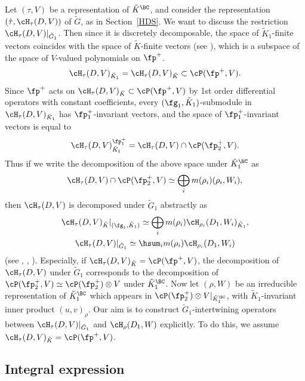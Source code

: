 Let $(\tau,V)$ be a representation of $\tilde{K}^\BC$, and consider the representation $(\hat{\tau},\cH_\tau(D,V))$ of $\tilde{G}$, as in Section~\ref{HDS}.
We want to discuss the restriction $\cH_\tau(D,V)|_{\tilde{G}_1}$.
Then since it is discretely decomposable, the space of $\tilde{K}_1$-finite vectors coincides with the space of $\tilde{K}$-finite vectors
(see \cite[Theorem~4.5]{K1}),
which is a subspace of the space of $V$-valued polynomials on $\fp^+$.
\begin{gather*} \cH_\tau(D,V)_{\tilde{K}_1}=\cH_\tau(D,V)_{\tilde{K}}\subset\cP(\fp^+,V). \end{gather*}
Since $\fp^+$ acts on $\cH_\tau(D,V)_{\tilde{K}}\subset\cP(\fp^+,V)$ by 1st order differential operators with constant coefficients,
every $(\fg_1,\tilde{K}_1)$-submodule in $\cH_\tau(D,V)_{\tilde{K}_1}$ has $\fp^+_1$-invariant vectors,
and the space of $\fp^+_1$-invariant vectors is equal to
\begin{gather*} \cH_\tau(D,V)_{\tilde{K}_1}^{\fp^+_1}=\cH_\tau(D,V)\cap\cP(\fp^+_2,V). \end{gather*}
Thus if we write the decomposition of the above space under $\tilde{K}_1^\BC$ as
\begin{gather*} \cH_\tau(D,V)\cap\cP(\fp^+_2,V)\simeq \bigoplus_i m(\rho_i)(\rho_i,W_i), \end{gather*}
then $\cH_\tau(D,V)$ is decomposed under $\tilde{G}_1$ abstractly as
\begin{gather*}
\cH_\tau(D,V)_{\tilde{K}}|_{(\fg_1,\tilde{K}_1)} \simeq \bigoplus_i m(\rho_i)\cH_{\rho_i}(D_1,W_i)_{\tilde{K}_1},\\
\cH_\tau(D,V)|_{\tilde{G}_1} \simeq \hsum_i m(\rho_i)\cH_{\rho_i}(D_1,W_i)
\end{gather*}
(see \cite{JV}, \cite[Section 8]{Kmf1}, \cite{Ma}). Especially, if $\cH_\tau(D,V)_{\tilde{K}}=\cP(\fp^+, V)$, the decomposition of
$\cH_\tau(D,V)$ under $\tilde{G}_1$ corresponds to the decomposition of $\cP(\fp^+_2,V)\simeq\cP(\fp^+_2)\otimes V$ under $\tilde{K}_1^\BC$.
Now let $(\rho,W)$ be an irreducible representation of $\tilde{K}_1^\BC$ which appears in $\cP(\fp^+_2)\otimes V|_{\tilde{K}_1^\BC}$,
with $\tilde{K}_1$-invariant inner product $(u,v)_\rho$.
Our aim is to construct $\tilde{G}_1$-intertwining operators between $\cH_\tau(D,V)|_{\tilde{G}_1}$ and $\cH_\rho(D_1,W)$
explicitly. To do this, we assume $\cH_\tau(D,V)_{\tilde{K}}=\cP(\fp^+,V)$.

\subsection{Integral expression}

